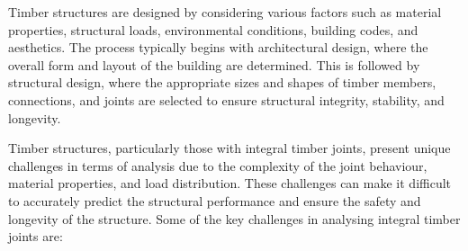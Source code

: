 Timber structures are designed by considering various factors such as material properties, structural loads, environmental conditions, building codes, and aesthetics. The process typically begins with architectural design, where the overall form and layout of the building are determined. This is followed by structural design, where the appropriate sizes and shapes of timber members, connections, and joints are selected to ensure structural integrity, stability, and longevity.

Timber structures, particularly those with integral timber joints, present unique challenges in terms of analysis due to the complexity of the joint behaviour, material properties, and load distribution. These challenges can make it difficult to accurately predict the structural performance and ensure the safety and longevity of the structure. Some of the key challenges in analysing integral timber joints are:

